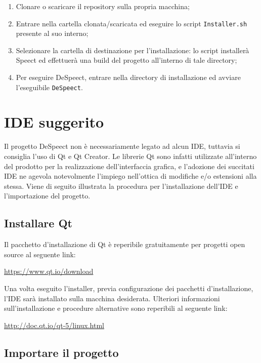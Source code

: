 \documentclass[openany,12pt,a4paper]{report}
\begin{document}
	\begin{enumerate}
		\item Clonare o scaricare il repository sulla propria macchina;
		\item Entrare nella cartella clonata/scaricata ed eseguire lo script \verb|Installer.sh| presente al suo interno;
		\item Selezionare la cartella di destinazione per l'installazione: lo script installerà Speect ed effettuerà una build del progetto all'interno di tale directory;
		\item Per eseguire DeSpeect, entrare nella directory di installazione ed avviare l'eseguibile \verb|DeSpeect|.
	\end{enumerate}
	
	\section{IDE suggerito}
	Il progetto DeSpeect non è necessariamente legato ad alcun IDE, tuttavia si consiglia l'uso di Qt e Qt Creator. Le librerie Qt sono infatti utilizzate all'interno del prodotto per la realizzazione dell'interfaccia grafica, e l'adozione dei succitati IDE ne agevola notevolmente l'impiego nell'ottica di modifiche e/o estensioni alla stessa. Viene di seguito illustrata la procedura per l'installazione dell'IDE e l'importazione del progetto.
	
	\subsection{Installare Qt}
	
	Il pacchetto d'installazione di Qt è reperibile gratuitamente per progetti open source al seguente link:
	\begin{center}
		\url{https://www.qt.io/download}
	\end{center}
	
	\noindent Una volta eseguito l'installer, previa configurazione dei pacchetti d'installazione, l'IDE sarà installato sulla macchina desiderata. Ulteriori informazioni sull'installazione e procedure alternative sono reperibili al seguente link:
	\begin{center}
		\url{http://doc.qt.io/qt-5/linux.html}
	\end{center} 
	
	\subsection{Importare il progetto}  
	
\end{document}
